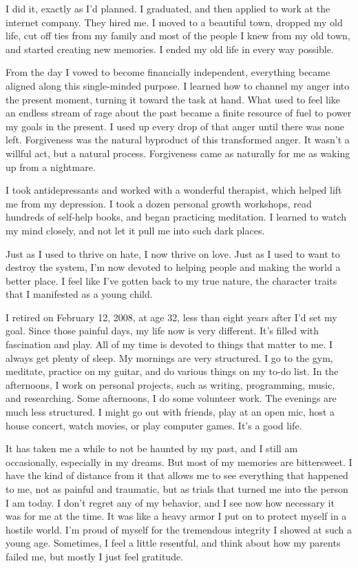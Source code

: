 I did it, exactly as I'd planned. I graduated, and then applied to work at the internet company. They hired me. I moved to a beautiful town, dropped my old life, cut off ties from my family and most of the people I knew from my old town, and started creating new memories. I ended my old life in every way possible.

From the day I vowed to become financially independent, everything became aligned along this single-minded purpose. I learned how to channel my anger into the present moment, turning it toward the task at hand. What used to feel like an endless stream of rage about the past became a finite resource of fuel to power my goals in the present. I used up every drop of that anger until there was none left. Forgiveness was the natural byproduct of this transformed anger. It wasn't a willful act, but a natural process. Forgiveness came as naturally for me as waking up from a nightmare.

I took antidepressants and worked with a wonderful therapist, which helped lift me from my depression. I took a dozen personal growth workshops, read hundreds of self-help books, and began practicing meditation. I learned to watch my mind closely, and not let it pull me into such dark places.

Just as I used to thrive on hate, I now thrive on love. Just as I used to want to destroy the system, I'm now devoted to helping people and making the world a better place. I feel like I've gotten back to my true nature, the character traits that I manifested as a young child.

I retired on February 12, 2008, at age 32, less than eight years after I'd set my goal. Since those painful days, my life now is very different. It's filled with fascination and play. All of my time is devoted to things that matter to me. I always get plenty of sleep. My mornings are very structured. I go to the gym, meditate, practice on my guitar, and do various things on my to-do list. In the afternoons, I work on personal projects, such as writing, programming, music, and researching. Some afternoons, I do some volunteer work. The evenings are much less structured. I might go out with friends, play at an open mic, host a house concert, watch movies, or play computer games. It's a good life.

It has taken me a while to not be haunted by my past, and I still am occasionally, especially in my dreams. But most of my memories are bittersweet. I have the kind of distance from it that allows me to see everything that happened to me, not as painful and traumatic, but as trials that turned me into the person I am today. I don't regret any of my behavior, and I see now how necessary it was for me at the time. It was like a heavy armor I put on to protect myself in a hostile world. I'm proud of myself for the tremendous integrity I showed at such a young age. Sometimes, I feel a little resentful, and think about how my parents failed me, but mostly I just feel gratitude.

